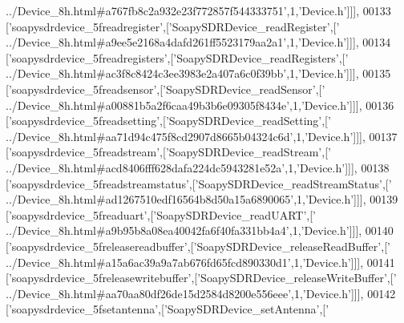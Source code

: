 \begin{DoxyCode}
{      ../Device\_8h.html#a767fb8c2a932e23f772857f544333751'},1,\textcolor{stringliteral}{'Device.h'}]]],
00133   [\textcolor{stringliteral}{'soapysdrdevice\_5freadregister'},[\textcolor{stringliteral}{'SoapySDRDevice\_readRegister'},[\textcolor{stringliteral}{'
      ../Device\_8h.html#a9ee5e2168a4dafd261ff5523179aa2a1'},1,\textcolor{stringliteral}{'Device.h'}]]],
00134   [\textcolor{stringliteral}{'soapysdrdevice\_5freadregisters'},[\textcolor{stringliteral}{'SoapySDRDevice\_readRegisters'},[\textcolor{stringliteral}{'
      ../Device\_8h.html#ac3f8c8424c3ee3983e2a407a6c0f39bb'},1,\textcolor{stringliteral}{'Device.h'}]]],
00135   [\textcolor{stringliteral}{'soapysdrdevice\_5freadsensor'},[\textcolor{stringliteral}{'SoapySDRDevice\_readSensor'},[\textcolor{stringliteral}{'
      ../Device\_8h.html#a00881b5a2f6caa49b3b6e09305f8434e'},1,\textcolor{stringliteral}{'Device.h'}]]],
00136   [\textcolor{stringliteral}{'soapysdrdevice\_5freadsetting'},[\textcolor{stringliteral}{'SoapySDRDevice\_readSetting'},[\textcolor{stringliteral}{'
      ../Device\_8h.html#aa71d94c475f8cd2907d8665b04324c6d'},1,\textcolor{stringliteral}{'Device.h'}]]],
00137   [\textcolor{stringliteral}{'soapysdrdevice\_5freadstream'},[\textcolor{stringliteral}{'SoapySDRDevice\_readStream'},[\textcolor{stringliteral}{'
      ../Device\_8h.html#acd8406fff628dafa224dc5943281e52a'},1,\textcolor{stringliteral}{'Device.h'}]]],
00138   [\textcolor{stringliteral}{'soapysdrdevice\_5freadstreamstatus'},[\textcolor{stringliteral}{'SoapySDRDevice\_readStreamStatus'},[\textcolor{stringliteral}{'
      ../Device\_8h.html#ad1267510edf16564b8d50a15a6890065'},1,\textcolor{stringliteral}{'Device.h'}]]],
00139   [\textcolor{stringliteral}{'soapysdrdevice\_5freaduart'},[\textcolor{stringliteral}{'SoapySDRDevice\_readUART'},[\textcolor{stringliteral}{'
      ../Device\_8h.html#a9b95b8a08ea40042fa6f40fa331bb4a4'},1,\textcolor{stringliteral}{'Device.h'}]]],
00140   [\textcolor{stringliteral}{'soapysdrdevice\_5freleasereadbuffer'},[\textcolor{stringliteral}{'SoapySDRDevice\_releaseReadBuffer'},[\textcolor{stringliteral}{'
      ../Device\_8h.html#a15a6ac39a9a7ab676fd65fcd890330d1'},1,\textcolor{stringliteral}{'Device.h'}]]],
00141   [\textcolor{stringliteral}{'soapysdrdevice\_5freleasewritebuffer'},[\textcolor{stringliteral}{'SoapySDRDevice\_releaseWriteBuffer'},[\textcolor{stringliteral}{'
      ../Device\_8h.html#aa70aa80df26de15d2584d8200e556eee'},1,\textcolor{stringliteral}{'Device.h'}]]],
00142   [\textcolor{stringliteral}{'soapysdrdevice\_5fsetantenna'},[\textcolor{stringliteral}{'SoapySDRDevice\_setAntenna'},[\textcolor{stringliteral}{'
}
\end{DoxyCode}
